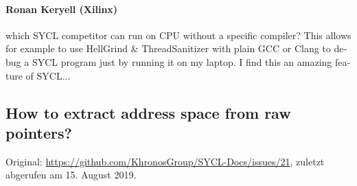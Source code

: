 \begin{otherlanguage}{english}
    \paragraph{Ronan Keryell (Xilinx)} which SYCL competitor can run on CPU
                              without a specific compiler? This allows for
                              example to use HellGrind \& ThreadSanitizer with
                              plain GCC or Clang to debug a SYCL program just by
                              running it on my laptop. I find this an amazing
                              feature of SYCL...
\end{otherlanguage}

\newpage
\subsection{How to extract address space from raw pointers?}
\label{anhang:diskussionen:syclspec:addressspace}

Original: \url{https://github.com/KhronosGroup/SYCL-Docs/issues/21}, zuletzt
abgerufen am 15. August 2019.

